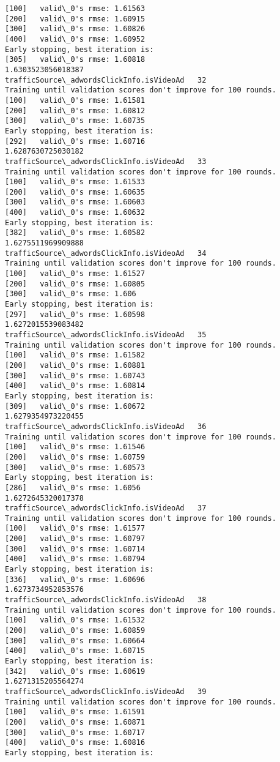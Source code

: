 \documentclass[11pt]{article}
\begin{document}
\begin{Verbatim}[commandchars=\\\{\}]
[100]	valid\_0's rmse: 1.61563
[200]	valid\_0's rmse: 1.60915
[300]	valid\_0's rmse: 1.60826
[400]	valid\_0's rmse: 1.60952
Early stopping, best iteration is:
[305]	valid\_0's rmse: 1.60818
1.6303523056018387
trafficSource\_adwordsClickInfo.isVideoAd   32
Training until validation scores don't improve for 100 rounds.
[100]	valid\_0's rmse: 1.61581
[200]	valid\_0's rmse: 1.60812
[300]	valid\_0's rmse: 1.60735
Early stopping, best iteration is:
[292]	valid\_0's rmse: 1.60716
1.6287630725030182
trafficSource\_adwordsClickInfo.isVideoAd   33
Training until validation scores don't improve for 100 rounds.
[100]	valid\_0's rmse: 1.61533
[200]	valid\_0's rmse: 1.60635
[300]	valid\_0's rmse: 1.60603
[400]	valid\_0's rmse: 1.60632
Early stopping, best iteration is:
[382]	valid\_0's rmse: 1.60582
1.6275511969909888
trafficSource\_adwordsClickInfo.isVideoAd   34
Training until validation scores don't improve for 100 rounds.
[100]	valid\_0's rmse: 1.61527
[200]	valid\_0's rmse: 1.60805
[300]	valid\_0's rmse: 1.606
Early stopping, best iteration is:
[297]	valid\_0's rmse: 1.60598
1.6272015539083482
trafficSource\_adwordsClickInfo.isVideoAd   35
Training until validation scores don't improve for 100 rounds.
[100]	valid\_0's rmse: 1.61582
[200]	valid\_0's rmse: 1.60881
[300]	valid\_0's rmse: 1.60743
[400]	valid\_0's rmse: 1.60814
Early stopping, best iteration is:
[309]	valid\_0's rmse: 1.60672
1.6279354973220455
trafficSource\_adwordsClickInfo.isVideoAd   36
Training until validation scores don't improve for 100 rounds.
[100]	valid\_0's rmse: 1.61546
[200]	valid\_0's rmse: 1.60759
[300]	valid\_0's rmse: 1.60573
Early stopping, best iteration is:
[286]	valid\_0's rmse: 1.6056
1.6272645320017378
trafficSource\_adwordsClickInfo.isVideoAd   37
Training until validation scores don't improve for 100 rounds.
[100]	valid\_0's rmse: 1.61577
[200]	valid\_0's rmse: 1.60797
[300]	valid\_0's rmse: 1.60714
[400]	valid\_0's rmse: 1.60794
Early stopping, best iteration is:
[336]	valid\_0's rmse: 1.60696
1.6273734952853576
trafficSource\_adwordsClickInfo.isVideoAd   38
Training until validation scores don't improve for 100 rounds.
[100]	valid\_0's rmse: 1.61532
[200]	valid\_0's rmse: 1.60859
[300]	valid\_0's rmse: 1.60664
[400]	valid\_0's rmse: 1.60715
Early stopping, best iteration is:
[342]	valid\_0's rmse: 1.60619
1.6271315205564274
trafficSource\_adwordsClickInfo.isVideoAd   39
Training until validation scores don't improve for 100 rounds.
[100]	valid\_0's rmse: 1.61591
[200]	valid\_0's rmse: 1.60871
[300]	valid\_0's rmse: 1.60717
[400]	valid\_0's rmse: 1.60816
Early stopping, best iteration is:

\end{Verbatim}
\end{document}
